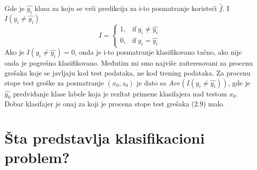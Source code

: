 Gde je $\hat{y_i}$ klasa za koju se vrši predikcija za i-to posmatranje
koristeći $\hat{f}$. I $I(y_i \neq \hat{y_i})$
\begin{equation}
    I=
    \begin{cases}
      1, & \text{if}\ y_i \neq \hat{y_i} \\
      0, & \text{if}\ y_i = \hat{y_i}
    \end{cases}
  \end{equation}
Ako je $I\left(y_i \neq \hat{y_i}\right) = 0$, onda je i-to posmatranje
klasifikovano tačno, ako nije onda je pogrešno klasifikovano. Međutim mi smo
najviše zaiteresovani za procenu grešaka koje se javljaju kod test podataka, ne
kod trening podataka. Za procenu stope test greške za posmatranje $\left(x_0, z_0\right)$
je dato sa $Ave\left(I\left(y_i \neq \hat{y_i}\right)\right)$, gde je $\hat{y_0}$
predviđanje klase labele koja je rezltat primene klasifajera nad testom $x_0$.
Dobar klasifajer je onaj za koji je procena stope test grešaka (2.9) malo.

\section{Šta predstavlja klasifikacioni problem?}

